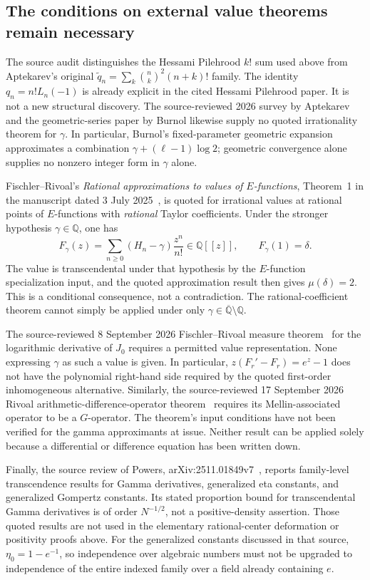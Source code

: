 \documentclass[11pt,a4paper]{article}
\theoremstyle{definition}
\theoremstyle{remark}
\theoremstyle{plain}
\numberwithin{equation}{section}
\begin{document}
\subsection{The conditions on external value theorems remain necessary}

The source audit distinguishes the Hessami Pilehrood $k!$ sum used
above from Aptekarev's original
$\widetilde q_n=\sum_k\binom nk^2(n+k)!$ family.
The identity $q_n=n!L_n(-1)$ is already explicit in the cited Hessami
Pilehrood paper. It is not a new structural discovery.
The source-reviewed 2026 survey by Aptekarev and the geometric-series
paper by Burnol likewise supply no quoted irrationality theorem for
$\gamma$. In particular, Burnol's fixed-parameter geometric expansion
approximates a combination $\gamma+(\ell-1)\log2$; geometric
convergence alone supplies no nonzero integer form in $\gamma$ alone.

Fischler--Rivoal's \emph{Rational approximations to values of
$E$-functions}, Theorem~1 in the manuscript dated 3 July 2025~\cite{FRrational}, is quoted
for irrational values at rational points of $E$-functions with
\emph{rational} Taylor coefficients. Under the stronger hypothesis
$\gamma\in\mathbb Q$, one has
\[
F_\gamma(z)=\sum_{n\ge0}(H_n-\gamma)\frac{z^n}{n!}
\in\mathbb Q[[z]],\qquad F_\gamma(1)=\delta.
\]
The value is transcendental under that hypothesis by the
$E$-function specialization input, and the quoted approximation
result then gives $\mu(\delta)=2$. This is a conditional consequence,
not a contradiction. The rational-coefficient theorem cannot simply
be applied under only $\gamma\in\overline{\mathbb Q}\setminus\mathbb Q$.

The source-reviewed 8 September 2026 Fischler--Rivoal measure theorem~\cite{sc:FRBessel} for the logarithmic derivative of $J_0$ requires a permitted value
representation. None expressing $\gamma$ as such a value is given.
In particular,
$z(F_r'-F_r)=e^z-1$ does not have the polynomial right-hand side
required by the quoted first-order inhomogeneous alternative.
Similarly, the source-reviewed 17 September 2026 Rivoal arithmetic-difference-operator theorem~\cite{sc:RivoalSigma} requires its Mellin-associated
operator to be a $G$-operator. The theorem's input conditions have
not been verified for the gamma approximants at issue. Neither result
can be applied solely because a differential or difference equation
has been written down.

Finally, the source review of Powers, arXiv:2511.01849v7~\cite{sc:Powers}, reports
family-level transcendence results for Gamma derivatives, generalized
eta constants, and generalized Gompertz constants. Its stated
proportion bound for transcendental Gamma derivatives is of order
$N^{-1/2}$, not a positive-density assertion. Those quoted results
are not used in the elementary rational-center deformation or
positivity proofs above. For the generalized constants discussed in that source,
$\eta_0=1-e^{-1}$, so independence over algebraic numbers must not
be upgraded to independence of the entire indexed family over a field
already containing $e$.
\end{document}
